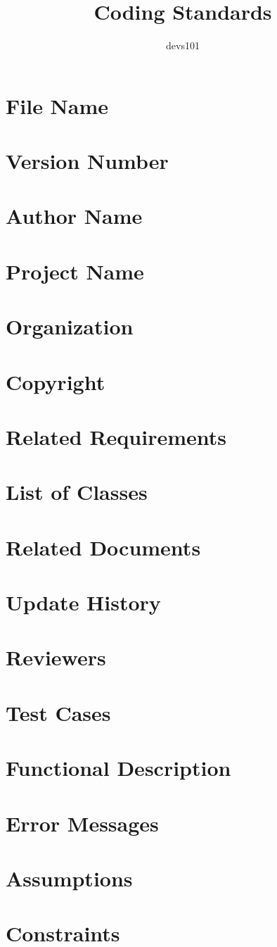 \documentclass{article}
\title{Coding Standards}
\author{devs101}
\begin{document}
\tableofcontents
\newpage

\section{File Name}
\section{Version Number}
\section{Author Name}
\section{Project Name}
\section{Organization}
\section{Copyright}
\section{Related Requirements}
\section{List of Classes}
\section{Related Documents}
\section{Update History}
\section{Reviewers}
\section{Test Cases}
\section{Functional Description}
\section{Error Messages}
\section{Assumptions}
\section{Constraints}
\end{document}
